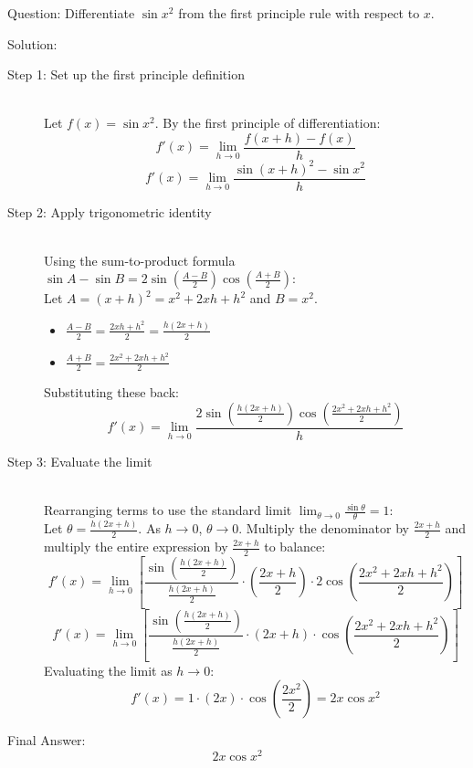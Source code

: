 \documentclass[11pt, a4paper]{article}
\begin{document}
Question:
Differentiate $\sin x^2$ from the first principle rule with respect to $x$.

Solution:

\begin{description}
    \item[Step 1: Set up the first principle definition] \ \\
    Let $f(x) = \sin x^2$.
    By the first principle of differentiation:
    \[ f'(x) = \lim_{h \to 0} \frac{f(x+h) - f(x)}{h} \]
    \[ f'(x) = \lim_{h \to 0} \frac{\sin (x+h)^2 - \sin x^2}{h} \]

    \item[Step 2: Apply trigonometric identity] \ \\
    Using the sum-to-product formula $\sin A - \sin B = 2 \sin\left(\frac{A-B}{2}\right) \cos\left(\frac{A+B}{2}\right)$:\\
    Let $A = (x+h)^2 = x^2 + 2xh + h^2$ and $B = x^2$.
    \begin{itemize}
        \item $\frac{A-B}{2} = \frac{2xh + h^2}{2} = \frac{h(2x+h)}{2}$
        \item $\frac{A+B}{2} = \frac{2x^2 + 2xh + h^2}{2}$
    \end{itemize}
    Substituting these back:
    \[ f'(x) = \lim_{h \to 0} \frac{2 \sin\left(\frac{h(2x+h)}{2}\right) \cos\left(\frac{2x^2 + 2xh + h^2}{2}\right)}{h} \]

    \item[Step 3: Evaluate the limit] \ \\
    Rearranging terms to use the standard limit $\lim_{\theta \to 0} \frac{\sin \theta}{\theta} = 1$:\\
    Let $\theta = \frac{h(2x+h)}{2}$. As $h \to 0$, $\theta \to 0$.
    Multiply the denominator by $\frac{2x+h}{2}$ and multiply the entire expression by $\frac{2x+h}{2}$ to balance:
    \[ f'(x) = \lim_{h \to 0} \left[ \frac{\sin\left(\frac{h(2x+h)}{2}\right)}{\frac{h(2x+h)}{2}} \cdot \left(\frac{2x+h}{2}\right) \cdot 2 \cos\left(\frac{2x^2 + 2xh + h^2}{2}\right) \right] \]
    \[ f'(x) = \lim_{h \to 0} \left[ \frac{\sin\left(\frac{h(2x+h)}{2}\right)}{\frac{h(2x+h)}{2}} \cdot (2x+h) \cdot \cos\left(\frac{2x^2 + 2xh + h^2}{2}\right) \right] \]
    Evaluating the limit as $h \to 0$:
    \[ f'(x) = 1 \cdot (2x) \cdot \cos\left(\frac{2x^2}{2}\right) = 2x \cos x^2 \]
\end{description}

Final Answer:
\[ 
\boxed{2x \cos x^2} 
\]
\end{document}

